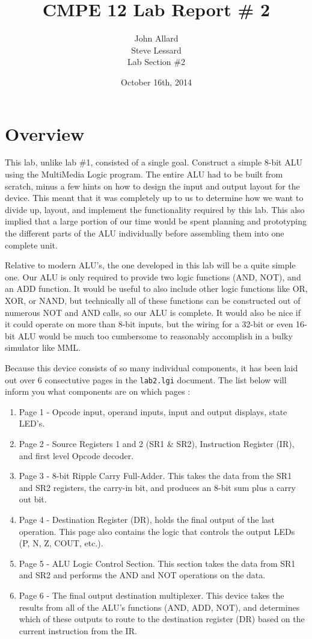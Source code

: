 \documentclass[a4paper,11pt]{article}
\title{ CMPE 12 Lab Report \# 2 \\[7 in]}
\author{John Allard \\ Steve Lessard \\ Lab Section \#2}
\date{October 16th, 2014}
\begin{document}
\maketitle
\newpage
\tableofcontents
\newpage


\section{Overview}
This lab, unlike lab \#1, consisted of a single goal. Construct a simple 8-bit ALU using the MultiMedia Logic program. The entire ALU had to be built from scratch, minus a few hints on how to design the input and output layout for the device. This meant that it was completely up to us to determine how we want to divide up, layout, and implement the functionality required by this lab. This also implied that a large portion of our time would be spent planning and prototyping the different parts of the ALU individually before assembling them into one complete unit. \par
Relative to modern ALU's, the one developed in this lab will be a quite simple one. Our ALU is only required to provide two logic functions (AND, NOT), and an ADD function. It would be useful to also include other logic functions like OR, XOR, or NAND, but technically all of these functions can be constructed out of numerous NOT and AND calls, so our ALU is complete. It would also be nice if it could operate on more than 8-bit inputs, but the wiring for a 32-bit or even 16-bit ALU would be much too cumbersome to reasonably accomplish in a bulky simulator like MML. \par  Because this device consists of so many individual components, it has been laid out over 6 consectutive pages in the \texttt{lab2.lgi} document. The list below will inform you what components are on which pages :
\begin{enumerate}
\item Page 1 - Opcode input, operand inputs, input and output displays, state LED's.
\item Page 2 - Source Registers 1 and 2 (SR1 \& SR2), Instruction Register (IR), and first level Opcode decoder.
\item Page 3 - 8-bit Ripple Carry Full-Adder. This takes the data from the SR1 and SR2 registers, the carry-in bit, and produces an 8-bit sum plus a carry out bit.
\item Page 4 - Destination Register (DR), holds the final output of the last operation. This page also contains the logic that controls the output LEDs (P, N, Z, COUT, etc.).
\item Page 5 - ALU Logic Control Section. This section takes the data from SR1 and SR2 and performs the AND and NOT operations on the data. 
\item Page 6 - The final output destination multiplexer. This device takes the results from all of the ALU's functions (AND, ADD, NOT), and determines which of these outputs to route to the destination register (DR) based on the current instruction from the IR. 
\end{enumerate}
\end{document}
